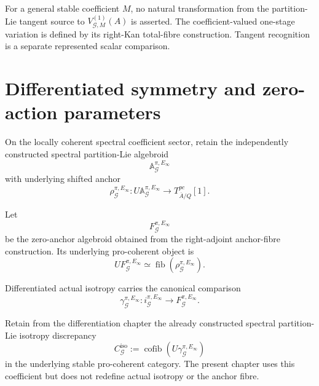 \begin{remark}
\label{rem:symmetry-noether-no-coefficient-valued-tangent-identification}
For a general stable coefficient $M$, no natural transformation from the
partition-Lie tangent source to $V_{\mathcal G,M}^{(1)}(A)$ is asserted.  The
coefficient-valued one-stage variation is defined by its right-Kan total-fibre
construction.  Tangent recognition is a separate represented scalar comparison.
\end{remark}

\section{Differentiated symmetry and zero-action parameters}
\label{sec:symmetry-noether-differentiated-symmetry-and-zero-action-parameters}
On the locally coherent spectral coefficient sector, retain the independently
constructed spectral partition-Lie algebroid
\[
\mathbb A_{\mathcal G}^{\pi,E_\infty}
\]
with underlying shifted anchor
\[
\rho_{\mathcal G}^{\pi,E_\infty}:
U\mathbb A_{\mathcal G}^{\pi,E_\infty}
\longrightarrow
T^{pc}_{\overline A/Q}[1].
\]

\begin{definition}
\label{def:symmetry-noether-homotopy-zero-action-algebroid}
Let
\[
F_{\mathcal G}^{\pi,E_\infty}
\]
be the zero-anchor algebroid obtained from the right-adjoint anchor-fibre
construction.  Its underlying pro-coherent object is
\[
UF_{\mathcal G}^{\pi,E_\infty}
\simeq
\operatorname{fib}
(\rho_{\mathcal G}^{\pi,E_\infty}).
\]
\end{definition}

Differentiated actual isotropy carries the canonical comparison
\[
\gamma_{\mathcal G}^{\pi,E_\infty}:
i_{\mathcal G}^{\pi,E_\infty}
\longrightarrow
F_{\mathcal G}^{\pi,E_\infty}.
\]

\begin{convention}
\label{def:symmetry-noether-isotropy-discrepancy}
Retain from the differentiation chapter the already constructed spectral
partition-Lie isotropy discrepancy
\[
\boxed{
C_{\mathcal G}^{\mathrm{iso}}
:=
\operatorname{cofib}
\left(
U\gamma_{\mathcal G}^{\pi,E_\infty}
\right)
}
\]
in the underlying stable pro-coherent category.  The present chapter uses this
coefficient but does not redefine actual isotropy or the anchor fibre.
\end{convention}


